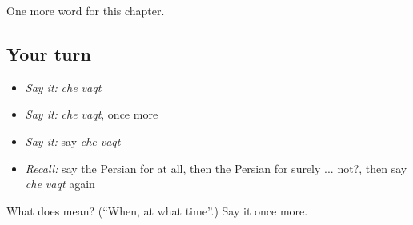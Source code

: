 \begin{grammarlens}[title={What you've built}]
One more word for this chapter.
\end{grammarlens}

\subsection*{Your turn}
\begin{itemize}
\raggedright
  \item \emph{Say it:} \emph{che vaqt}
  \item \emph{Say it:} \emph{che vaqt}, once more
  \item \emph{Say it:} say \emph{che vaqt}
  \item \emph{Recall:} say the Persian for at all, then the Persian for surely ... not?, then say \emph{che vaqt} again
\end{itemize}

\begin{tcolorbox}[breakable,colback=teal!4,colframe=teal!35!black,title={Before you move on}]
What does   mean? (\textquotedblleft{}When, at what time\textquotedblright{}.) Say it once more.
\end{tcolorbox}
